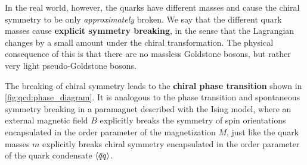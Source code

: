 In the real world, however, the quarks have different masses and cause the chiral symmetry to be only \emph{approximately} broken.
We say that the different quark masses cause \textbf{explicit symmetry breaking}, in the sense that the Lagrangian changes by a small amount under the chiral transformation.
The physical consequence of this is that there are no massless Goldstone bosons, but rather very light pseudo-Goldstone bosons.

The breaking of chiral symmetry leads to the \textbf{chiral phase transition} shown in \cref{fig:qcd:phase_diagram}.
It is analogous to the phase transition and spontaneous symmetry breaking in a paramagnet described with the Ising model,
where an external magnetic field $B$ explicitly breaks the symmetry of spin orientations encapsulated in the order parameter of the magnetization $M$,
just like the quark masses $m$ explicitly breaks chiral symmetry encapsulated in the order parameter of the quark condensate $\langle \bar{q} q \rangle$.

